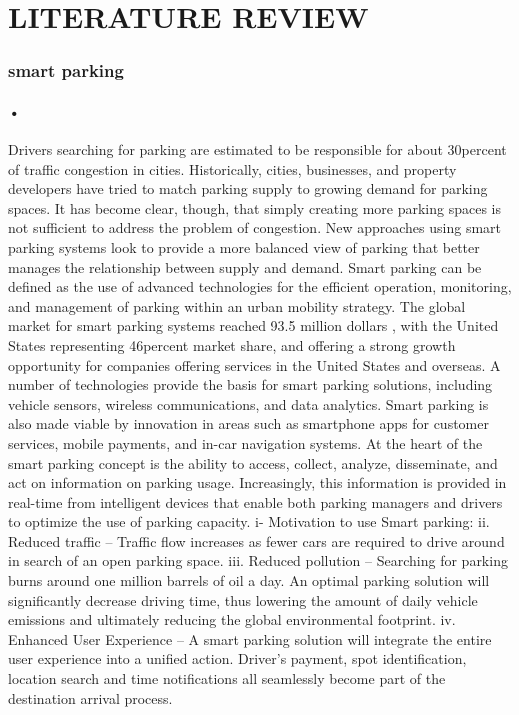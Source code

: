 \documentclass[12pt]{article}
\begin{document}
\section{LITERATURE REVIEW}
\subsubsection {smart parking}
\paragraph{•}
Drivers searching for parking are estimated to be responsible for about 30percent of traffic congestion in cities. Historically, cities, businesses, and property developers have tried to match parking supply to growing demand for parking spaces. It has become clear, though, that simply creating more parking spaces is not sufficient to address the problem of congestion. New approaches using smart parking systems look to provide a more balanced view of parking that better manages the relationship between supply and demand. 
Smart parking can be defined as the use of advanced technologies for the efficient operation, monitoring, and management of parking within an urban mobility strategy. The global market for smart parking systems reached 93.5 million dollars , with the United States representing 46percent market share, and offering a strong growth opportunity for companies offering services in the United States and overseas. A number of technologies provide the basis for smart parking solutions, including vehicle sensors, wireless communications, and data analytics. Smart parking is also made viable by innovation in areas such as smartphone apps for customer services, mobile payments, and in-car navigation systems. At the heart of the smart parking concept is the ability to access, collect, analyze, disseminate, and act on information on parking usage. Increasingly, this information is provided in real-time from intelligent devices that enable both parking managers and drivers to optimize the use of parking capacity. 
i- Motivation to use Smart parking:  
ii. Reduced traffic – Traffic flow increases as fewer cars are required to drive around in search of an open parking space. 
iii. Reduced pollution – Searching for parking burns around one million barrels of oil a day. An optimal parking solution will significantly decrease driving time, thus lowering the amount of daily vehicle emissions and ultimately reducing the global environmental footprint. 
iv. Enhanced User Experience – A smart parking solution will integrate the entire user experience into a unified action. Driver’s payment, spot identification, location search and time notifications all seamlessly become part of the destination arrival process. 
\end{document}
